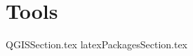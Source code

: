 \documentclass[class=book , crop=false]{standalone}
\begin{document}
\chapter{Tools}

{QGISSection.tex}
{latexPackagesSection.tex}
\end{document}

